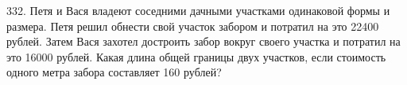332.  Петя и Вася владеют соседними дачными участками одинаковой формы и размера. Петя решил
обнести свой участок забором и потратил на это 22400 рублей. Затем Вася захотел достроить забор
вокруг своего участка и потратил на это 16000 рублей. Какая длина общей границы двух участков,
если стоимость одного метра забора составляет 160 рублей?\\
